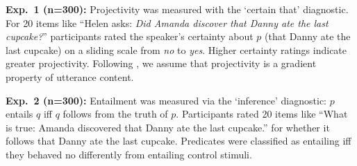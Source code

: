 \documentclass[12pt,fleqn]{article}
\newcommand{\6}{\mbox{$[\hspace*{-.6mm}[$}}
\newcommand{\9}{\mbox{$]\hspace*{-.6mm}]$}}
\begin{document}
{\bf Exp.~1 (n=300):} Projectivity was measured with the `certain that' diagnostic. For 20 items like ``Helen asks: \emph{Did Amanda discover that Danny ate the last cupcake?}'' participants rated the speaker's certainty about $p$ (that Danny ate the last cupcake) on a sliding scale from \emph{no} to \emph{yes}. Higher certainty ratings indicate greater projectivity. Following \cite*{tbd-variability}, we assume that projectivity is a gradient property of utterance content. 

{\bf Exp.~2 (n=300):} Entailment was measured via the `inference' diagnostic: $p$ entails $q$ iff $q$ follows from the truth of $p$. %
Participants rated 20 items like ``What is true: Amanda discovered that Danny ate the last cupcake.'' for whether it follows that Danny ate the last cupcake. Predicates were classified as entailing iff they behaved no differently from entailing control stimuli. 
\end{document}
